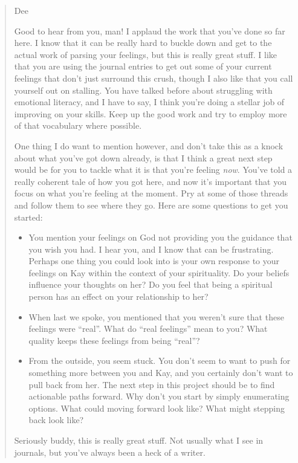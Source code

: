 \begin{quote}
Dee

Good to hear from you, man! I applaud the work that you've done so far here. I know that it can be really hard to buckle down and get to the actual work of parsing your feelings, but this is really great stuff. I like that you are using the journal entries to get out some of your current feelings that don't just surround this crush, though I also like that you call yourself out on stalling. You have talked before about struggling with emotional literacy, and I have to say, I think you're doing a stellar job of improving on your skills. Keep up the good work and try to employ more of that vocabulary where possible.

One thing I do want to mention however, and don't take this as a knock about what you've got down already, is that I think a great next step would be for you to tackle what it is that you're feeling \emph{now}. You've told a really coherent tale of how you got here, and now it's important that you focus on what you're feeling at the moment. Pry at some of those threads and follow them to see where they go. Here are some questions to get you started:

\begin{itemize}
\tightlist
\item
  You mention your feelings on God not providing you the guidance that you wish you had. I hear you, and I know that can be frustrating. Perhaps one thing you could look into is your own response to your feelings on Kay within the context of your spirituality. Do your beliefs influence your thoughts on her? Do you feel that being a spiritual person has an effect on your relationship to her?
\item
  When last we spoke, you mentioned that you weren't sure that these feelings were ``real''. What do ``real feelings'' mean to you? What quality keeps these feelings from being ``real''?
\item
  From the outside, you seem stuck. You don't seem to want to push for something more between you and Kay, and you certainly don't want to pull back from her. The next step in this project should be to find actionable paths forward. Why don't you start by simply enumerating options. What could moving forward look like? What might stepping back look like?
\end{itemize}

Seriously buddy, this is really great stuff. Not usually what I see in journals, but you've always been a heck of a writer.


\end{quote}
